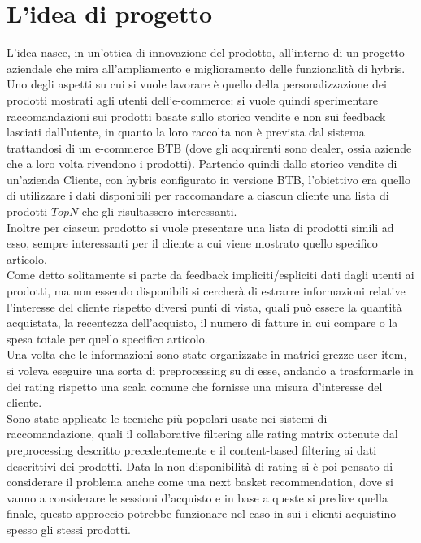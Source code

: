 \section{L'idea di progetto}
L'idea nasce, in un'ottica di innovazione del prodotto, all'interno di un progetto aziendale che mira all'ampliamento e miglioramento delle funzionalità di hybris. Uno degli aspetti su cui si vuole lavorare è quello della personalizzazione dei prodotti mostrati agli utenti dell'e-commerce: si vuole quindi sperimentare raccomandazioni sui prodotti basate sullo storico vendite e non sui feedback lasciati dall'utente, in quanto la loro raccolta non è prevista dal sistema trattandosi di un e-commerce BTB (dove gli acquirenti sono dealer, ossia aziende che a loro volta rivendono i prodotti).
Partendo quindi dallo storico vendite di un'azienda Cliente, con hybris configurato in versione BTB, l'obiettivo era quello di utilizzare i dati disponibili per raccomandare a ciascun cliente una lista di prodotti $TopN$ che gli risultassero interessanti.\\ 
Inoltre per ciascun prodotto si vuole presentare una lista di prodotti simili ad esso, sempre interessanti per il cliente a cui viene mostrato quello specifico articolo.\\
Come detto solitamente si parte da feedback impliciti/espliciti dati dagli utenti ai prodotti, ma non essendo disponibili si cercherà di estrarre informazioni relative l'interesse del cliente rispetto diversi punti di vista, quali può essere la quantità acquistata, la recentezza dell'acquisto, il numero di fatture in cui compare o la spesa totale per quello specifico articolo.\\
Una volta che le informazioni sono state organizzate in matrici grezze user-item, si voleva eseguire una sorta di preprocessing su di esse, andando a trasformarle in dei rating rispetto una scala comune che fornisse una misura d'interesse del cliente.\\
Sono state applicate le tecniche più popolari usate nei sistemi di raccomandazione, quali il collaborative filtering alle rating matrix ottenute dal preprocessing descritto precedentemente e il content-based filtering ai dati descrittivi dei prodotti.
Data la non disponibilità di rating si è poi pensato di considerare il problema anche come una next basket recommendation, dove si vanno a considerare le sessioni d'acquisto e in base a queste si predice quella finale, questo approccio potrebbe funzionare nel caso in sui i clienti acquistino spesso gli stessi prodotti.

